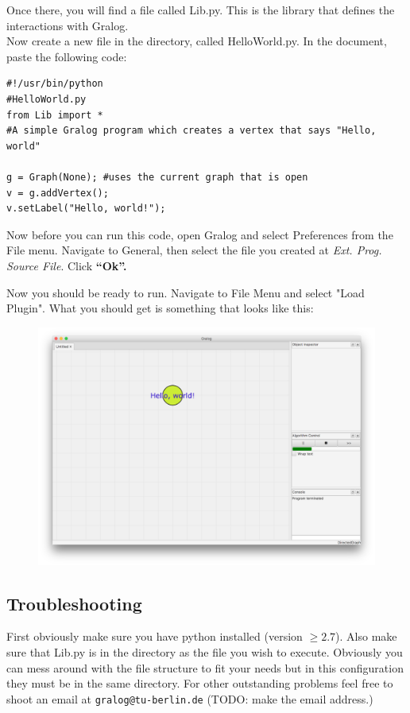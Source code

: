 \documentclass{article}
\begin{document}
Once there, you will find a file called Lib.py. This is the library that defines the interactions with Gralog.\\

Now create a new file in the directory, called HelloWorld.py. In the document, paste the following code: 

\begin{lstlisting}
#!/usr/bin/python
#HelloWorld.py
from Lib import *
#A simple Gralog program which creates a vertex that says "Hello, world"

g = Graph(None); #uses the current graph that is open
v = g.addVertex();
v.setLabel("Hello, world!");
\end{lstlisting}

Now before you can run this code, open Gralog and select Preferences from the File menu. Navigate to General, then select the file you created at \emph{Ext. Prog. Source File}. Click \textbf{``Ok''.}

Now you should be ready to run. Navigate to File Menu and select "Load Plugin". What you should get is something that looks like this: 

\begin{figure}[H]
\centering
\includegraphics[width=\textwidth]{helloWorld.png}
\end{figure}

\subsection{Troubleshooting}
First obviously make sure you have python installed (version $\ge
2.7$). Also make sure that Lib.py is in the directory as the file you
wish to execute. Obviously you can mess around with the file structure
to fit your needs but in this configuration they must be in the same
directory. For other outstanding problems feel free to shoot an email
at \texttt{gralog@tu-berlin.de} (TODO: make the email address.)
\end{document}
